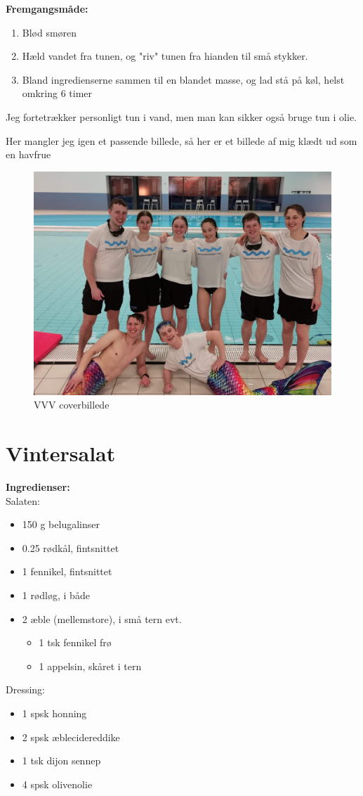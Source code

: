 \documentclass{book}
\begin{document}
\begin{minipage}[t]{0.5\textwidth}
\textbf{Fremgangsmåde:}
\begin{enumerate}
    \item Blød smøren
    \item Hæld vandet fra tunen, og "riv" tunen fra hianden til små stykker.
    \item Bland ingredienserne sammen til en blandet masse, og lad stå på køl, helst omkring 6 timer
\end{enumerate}
\end{minipage}
Jeg fortetrækker personligt tun i vand, men man kan sikker også bruge tun i olie.

\newpage Her mangler jeg igen et passende billede, så her er et billede af mig klædt ud som en havfrue\begin{figure}
    \centering
    \includegraphics[width=0.75\linewidth]{received_483340176906259.jpeg}
    \caption{VVV coverbillede}
    
\end{figure}
\newpage \section{Vintersalat}
\begin{minipage}[t]{0.5\textwidth}
\textbf{Ingredienser:}
\\ Salaten: 
\begin{itemize}
    \item 150 g belugalinser
    \item 0.25 rødkål, fintsnittet
    \item 1 fennikel, fintsnittet
    \item 1 rødløg, i både
    \item 2 æble (mellemstore), i små tern
    evt.
    \begin{itemize}
        \item 1 tsk fennikel frø
        \item 1 appelsin, skåret i tern
    \end{itemize}
\end{itemize}
Dressing:
\begin{itemize}
    \item 1 spsk honning
    \item 2 spsk æblecidereddike
    \item 1 tsk dijon sennep
    \item 4 spsk olivenolie
\end{itemize}
\end{minipage}
\end{document}
